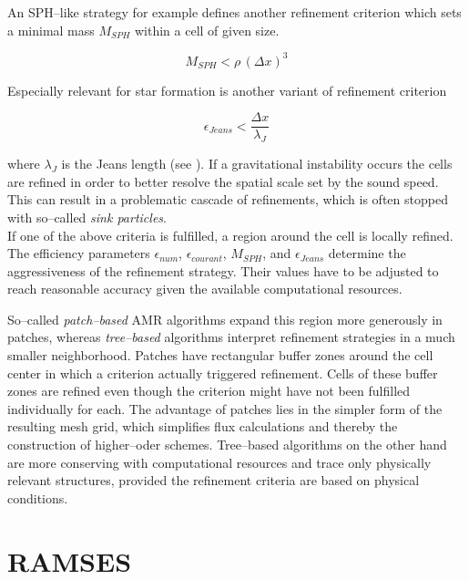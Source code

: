 An SPH--like strategy for example defines another refinement criterion which sets a minimal mass $M_{SPH}$ within a cell of given size.

\begin{equation}
  M_{SPH} < \rho\,(\Delta x)^{3}
\end{equation}

Especially relevant for star formation is another variant of refinement criterion

\begin{equation}
  \epsilon_{Jeans} < \frac{\Delta x}{\lambda_{J}}
\end{equation}

where $\lambda_{J}$ is the Jeans length (see ).
If a gravitational instability occurs the cells are refined in order to better resolve the spatial scale set by the sound speed.
This can result in a problematic cascade of refinements, which is often stopped with so--called \textit{sink particles}.
\\[6pt]
%
If one of the above criteria is fulfilled, a region around the cell is locally refined.
The efficiency parameters $\epsilon_{num}$, $\epsilon_{courant}$, $M_{SPH}$, and $\epsilon_{Jeans}$ determine the aggressiveness of the refinement strategy.
Their values have to be adjusted to reach reasonable accuracy given the available computational resources.

So--called \textit{patch--based} AMR algorithms expand this region more generously in patches, whereas \textit{tree--based} algorithms interpret refinement strategies in a much smaller neighborhood.
Patches have rectangular buffer zones around the cell center in which a criterion actually triggered refinement.
Cells of these buffer zones are refined even though the criterion might have not been fulfilled individually for each.
The advantage of patches lies in the simpler form of the resulting mesh grid, which simplifies flux calculations and thereby the construction of higher--oder schemes.
Tree--based algorithms on the other hand are more conserving with computational resources and trace only physically relevant structures, provided the refinement criteria are based on physical conditions.


\section{RAMSES}
\label{sec:RAMSES}

